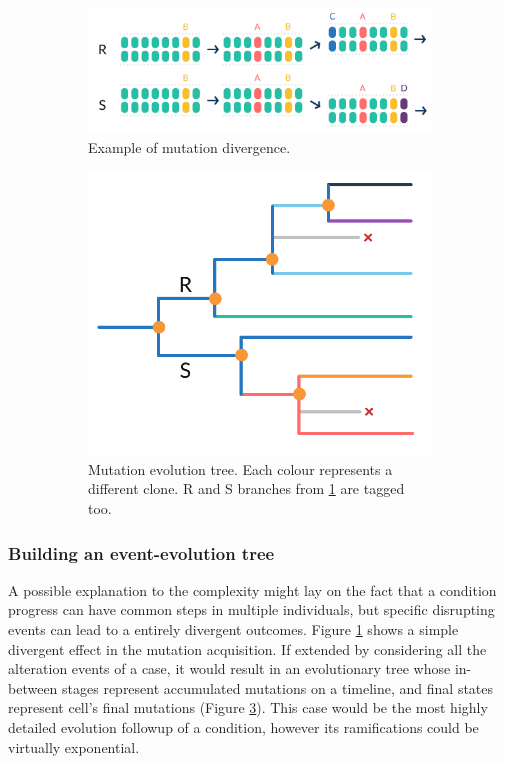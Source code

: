 \begin{figure}
    \centering
    \begin{subfigure}[b]{0.5\textwidth}
      \includegraphics[width=\textwidth]{images/Div.png}
      \caption{Example of mutation divergence.}
      \label{fig:div}
    \end{subfigure}
    \hfill
    \begin{subfigure}[b]{0.40\textwidth}
      \includegraphics[width=\textwidth]{images/Pyl.png}
      \caption{Mutation evolution tree. Each colour represents a different clone. R and S branches from \ref{fig:div} are tagged too.}
      \label{fig:phyl}
    \end{subfigure}
    \caption{}
\end{figure}


\subsubsection{Building an event-evolution tree}
A possible explanation to the complexity might lay on the fact that a condition progress can have common steps in multiple individuals, but specific disrupting events can lead to a entirely divergent outcomes. Figure \ref{fig:div} shows a simple divergent effect in the mutation acquisition. If extended by considering all the alteration events of a case, it would result in an evolutionary tree whose in-between stages represent accumulated mutations on a timeline, and final states represent cell's final mutations (Figure \ref{fig:phyl}). This case would be the most highly detailed evolution followup of a condition, however its ramifications could be virtually exponential.
\\

